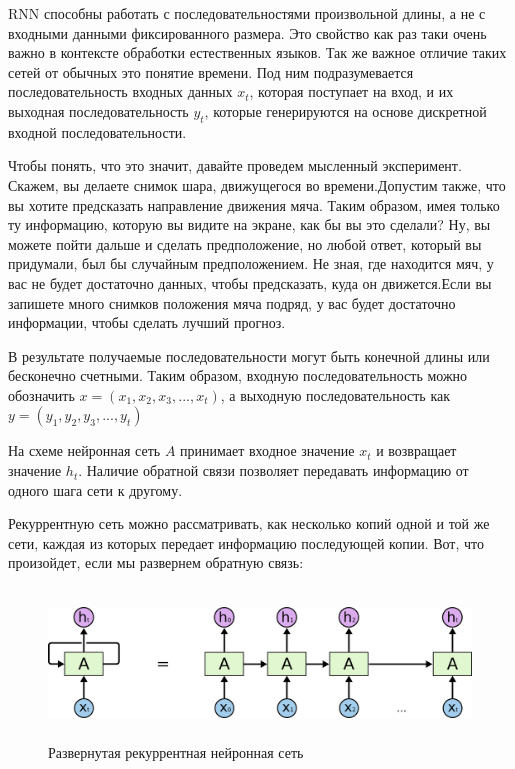 	RNN способны работать с последовательностями произвольной длины, а не с входными данными фиксированного размера. Это свойство как раз таки очень важно в контексте обработки естественных языков. Так же важное отличие таких сетей от обычных это понятие времени. Под ним подразумевается последовательность входных данных $x_t$, которая поступает на вход, и их выходная последовательность $y_t$, которые генерируются на основе дискретной входной последовательности. 
	
	Чтобы понять, что это значит, давайте проведем мысленный эксперимент. Скажем, вы делаете снимок шара, движущегося во времени.Допустим также, что вы хотите предсказать направление движения мяча. Таким образом, имея только ту информацию, которую вы видите на экране, как бы вы это сделали? Ну, вы можете пойти дальше и сделать предположение, но любой ответ, который вы придумали, был бы случайным предположением. Не зная, где находится мяч, у вас не будет достаточно данных, чтобы предсказать, куда он движется.Если вы запишете много снимков положения мяча подряд, у вас будет достаточно информации, чтобы сделать лучший прогноз.
	
	В результате получаемые последовательности могут быть конечной длины или бесконечно счетными. Таким образом, входную последовательность можно обозначить $x = (x_1, x_2, x_3, ... , x_t)$, а выходную последовательность как $y = (y_1, y_2, y_3, ... , y_t)$
	
	На схеме нейронная сеть $A$ принимает входное значение $x_t$ и возвращает значение $h_t$. Наличие обратной связи позволяет передавать информацию от одного шага сети к другому.
	
	Рекуррентную сеть можно рассматривать, как несколько копий одной и той же сети, каждая из которых передает информацию последующей копии. Вот, что произойдет, если мы развернем обратную связь:
	
	\begin{figure}[ht!]
		\centering
		\captionsetup{justification=centering}
		\includegraphics[height=40mm]{img/3.png}
		\caption{Развернутая рекуррентная нейронная сеть}
	\end{figure}
	
